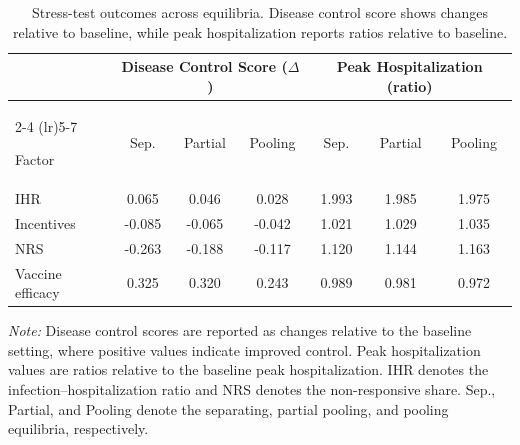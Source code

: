 \documentclass[sigconf,review]{acmart}
\begin{document}
\begin{table}[tbp]
\centering
\caption{Stress-test outcomes across equilibria. Disease control score shows
changes relative to baseline, while peak hospitalization reports ratios
relative to baseline.}
\label{tab:stress}

\vspace{-2mm}
\small
\setlength{\tabcolsep}{2.5pt}
\renewcommand{\arraystretch}{.95}

\begin{tabular}{@{}lcccccc@{}}
\toprule
& \multicolumn{3}{c}{Disease Control Score ($\Delta$)}
& \multicolumn{3}{c}{Peak Hospitalization (ratio)} \\
\cmidrule(lr){2-4}
\cmidrule(lr){5-7}

Factor 
& Sep.
& Partial
& Pooling
& Sep.
& Partial
& Pooling \\

\midrule

IHR
& 0.065
& 0.046
& 0.028
& 1.993
& 1.985
& 1.975 \\

Incentives
& -0.085
& -0.065
& -0.042
& 1.021
& 1.029
& 1.035 \\

NRS
& -0.263
& -0.188
& -0.117
& 1.120
& 1.144
& 1.163 \\

Vaccine efficacy
& 0.325
& 0.320
& 0.243
& 0.989
& 0.981
& 0.972 \\

\bottomrule
\end{tabular}
\vspace{1mm} \parbox{\columnwidth}{ \footnotesize \textit{Note:} Disease control scores are reported as changes relative to the baseline setting, where positive values indicate improved control. Peak hospitalization values are ratios relative to the baseline peak hospitalization. IHR denotes the infection--hospitalization ratio and NRS denotes the non-responsive share. Sep., Partial, and Pooling denote the separating, partial pooling, and pooling equilibria, respectively. }
\vspace{-5mm}
\end{table}
\end{document}
